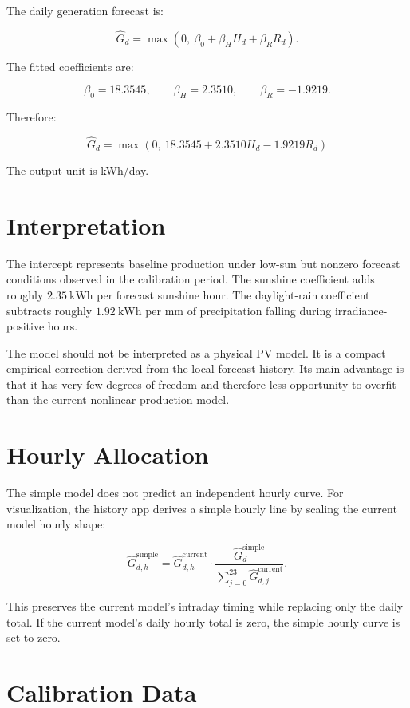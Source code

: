 \documentclass[11pt,a4paper]{article}
\begin{document}
The daily generation forecast is:

\[
\widehat{G}_d =
\max\left(0,\ \beta_0 + \beta_H H_d + \beta_R R_d\right).
\]

The fitted coefficients are:

\[
\beta_0 = 18.3545,
\qquad
\beta_H = 2.3510,
\qquad
\beta_R = -1.9219.
\]

Therefore:

\[
\boxed{
\widehat{G}_d =
\max\left(0,\ 18.3545 + 2.3510 H_d - 1.9219 R_d\right)
}
\]

The output unit is kWh/day.

\section{Interpretation}

The intercept represents baseline production under low-sun but nonzero forecast conditions observed in the calibration period. The sunshine coefficient adds roughly \(2.35\ \mathrm{kWh}\) per forecast sunshine hour. The daylight-rain coefficient subtracts roughly \(1.92\ \mathrm{kWh}\) per mm of precipitation falling during irradiance-positive hours.

The model should not be interpreted as a physical PV model. It is a compact empirical correction derived from the local forecast history. Its main advantage is that it has very few degrees of freedom and therefore less opportunity to overfit than the current nonlinear production model.

\section{Hourly Allocation}

The simple model does not predict an independent hourly curve. For visualization, the history app derives a simple hourly line by scaling the current model hourly shape:

\[
\widehat{G}^{\mathrm{simple}}_{d,h}
=
\widehat{G}^{\mathrm{current}}_{d,h}
\cdot
\frac{\widehat{G}^{\mathrm{simple}}_d}
{\sum_{j=0}^{23}\widehat{G}^{\mathrm{current}}_{d,j}}.
\]

This preserves the current model's intraday timing while replacing only the daily total. If the current model's daily hourly total is zero, the simple hourly curve is set to zero.

\section{Calibration Data}
\end{document}
